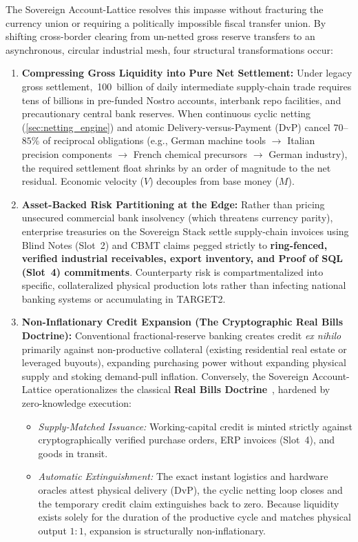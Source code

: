 \documentclass[a4paper,11pt,twoside,parskip=half-,headings=small]{scrartcl}
\newcommand{\EUR}[1]{\texteuro\,#1}
\begin{document}
The Sovereign Account-Lattice resolves this impasse without fracturing the currency union or requiring a politically impossible fiscal transfer union. By shifting cross-border clearing from un-netted gross reserve transfers to an asynchronous, circular industrial mesh, four structural transformations occur:
\begin{enumerate}[nosep]
  \item \textbf{Compressing Gross Liquidity into Pure Net Settlement:} Under legacy gross settlement, \EUR{100~billion} of daily intermediate supply-chain trade requires tens of billions in pre-funded Nostro accounts, interbank repo facilities, and precautionary central bank reserves. When continuous cyclic netting (\cref{sec:netting_engine}) and atomic Delivery-versus-Payment (DvP) cancel $70$--$85\%$ of reciprocal obligations (e.g., German machine tools $\to$ Italian precision components $\to$ French chemical precursors $\to$ German industry), the required settlement float shrinks by an order of magnitude to the net residual. Economic velocity ($V$) decouples from base money ($M$).
  \item \textbf{Asset-Backed Risk Partitioning at the Edge:} Rather than pricing unsecured commercial bank insolvency (which threatens currency parity), enterprise treasuries on the Sovereign Stack settle supply-chain invoices using Blind Notes (Slot~2) and CBMT claims pegged strictly to \textbf{ring-fenced, verified industrial receivables, export inventory, and Proof of SQL (Slot~4) commitments}. Counterparty risk is compartmentalized into specific, collateralized physical production lots rather than infecting national banking systems or accumulating in TARGET2.
  \item \textbf{Non-Inflationary Credit Expansion (The Cryptographic Real Bills Doctrine):} Conventional fractional-reserve banking creates credit \emph{ex nihilo} primarily against non-productive collateral (existing residential real estate or leveraged buyouts), expanding purchasing power without expanding physical supply and stoking demand-pull inflation. Conversely, the Sovereign Account-Lattice operationalizes the classical \textbf{Real Bills Doctrine}~\cite{sargent1982realbills}, hardened by zero-knowledge execution:
  \begin{itemize}[nosep]
    \item \emph{Supply-Matched Issuance:} Working-capital credit is minted strictly against cryptographically verified purchase orders, ERP invoices (Slot~4), and goods in transit.
    \item \emph{Automatic Extinguishment:} The exact instant logistics and hardware oracles attest physical delivery (DvP), the cyclic netting loop closes and the temporary credit claim extinguishes back to zero. Because liquidity exists solely for the duration of the productive cycle and matches physical output $1:1$, expansion is structurally non-inflationary.

\end{itemize}
\end{enumerate}
\end{document}
